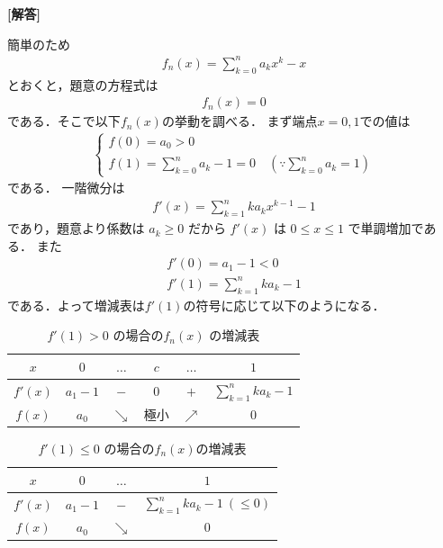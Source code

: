 \documentclass[../../main.tex]{subfiles}
\begin{document}
\begin{oframed}
  
\end{oframed}

{\bf [解答]}

簡単のため
\begin{align}
  f_n(x) = \sum_{k=0}^n a_k x^k - x
\end{align}
とおくと，題意の方程式は
\begin{align}
  f_n(x) = 0
\end{align}
である．そこで以下$f_n(x)$の挙動を調べる．
まず端点$x=0, 1$での値は
\begin{align}
  \begin{cases}
    f(0) = a_0 > 0 \\
    f(1) = \sum_{k=0}^n a_k - 1 = 0 \quad (\because \sum_{k=0}^n a_k = 1)
  \end{cases}
\end{align}
である．
一階微分は
\begin{align}
  f'(x) = \sum_{k=1}^n k a_k x^{k-1} - 1
\end{align}
であり，題意より係数は $a_k \ge 0$ だから $f'(x)$ は $0 \le x \le 1$ で単調増加である．
また
\begin{align}
  f'(0) = a_1 - 1 < 0 \\
  f'(1) = \sum_{k=1}^n k a_k -1
\end{align}
である．よって増減表は$f'(1)$の符号に応じて以下のようになる．

\begin{table}[htb]
  \centering
  \label{table:1}
  \caption{$f'(1) > 0$ の場合の$f_n(x)$ の増減表}
  \begin{tabular}{c|ccccc}
    $x$ & $0$ & $\dots$ & $c$ & $\dots$ & $1$ \\ \hline
    $f'(x)$ & $a_1-1$ & $-$ & $0$ & $+$ & $\sum_{k=1}^n k a_k - 1$ \\ \hline
    $f(x)$ & $a_0$ & $\searrow$ & 極小 & $\nearrow$ & $0$
  \end{tabular}
\end{table}

\begin{table}[htb]
  \centering
  \caption{$f'(1) \le 0$ の場合の$f_n(x)$の増減表}
  \begin{tabular}{c|ccc}
    $x$ & $0$ & $\dots$ & $1$ \\ \hline
    $f'(x)$ & $a_1-1$ & $-$ & $\sum_{k=1}^n k a_k - 1 \ (\le 0)$ \\ \hline
    $f(x)$ & $a_0$ & $\searrow$ & $0$
  \end{tabular}
\end{table}
\end{document}
